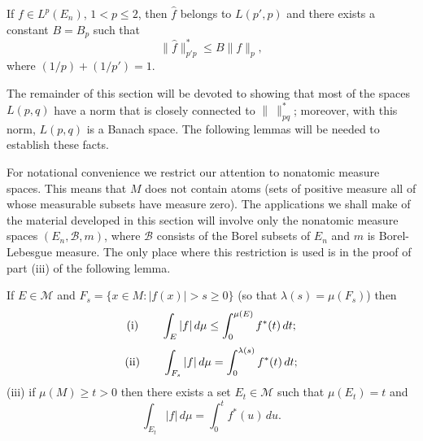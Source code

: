 \begin{corollary}\label{cor:c5-3-16}
If $f \in L^{p}(E_{n})$, $1 < p \leq 2$, then $\hat{f}$ belongs to
$L(p', p)$ and there exists a constant $B = B_{p}$ such that
\[
\|\hat{f}\|_{p'p}^{*}\leq B\|f\|_{p},
\]
where $(1/p) + (1/p') = 1$.
\end{corollary}

The remainder of this section will be devoted to showing that most of the
spaces $L(p, q)$ have a norm that is closely connected to $\|\ \|_{pq}^{*}$;
moreover, with this norm, $L(p, q)$ is a Banach space. The following lemmas
will be needed to establish these facts.

For notational convenience we restrict our attention to nonatomic measure
spaces. This means that $M$ does not contain atoms (sets of positive measure
all of whose measurable subsets have measure zero). The applications we shall
make of the material developed in this section will involve only the nonatomic
measure spaces $(E_{n}, \mathcal{B}, m)$, where $\mathcal{B}$ consists of the
Borel subsets of $E_{n}$ and $m$ is Borel-Lebesgue measure. The only place
where this restriction is used is in the proof of part (iii) of the following
lemma.

\begin{lemma}\label{lem:c5-3-17}
If $E \in \mathcal{M}$ and
$F_{s} = \{x \in M : |f(x)| > s \geq 0\}$ (so that $\lambda(s) = \mu(F_{s})$)
then
\[
\textup{(i)}\qquad \int_{E}|f|\,d\mu\leq\int_{0}^{\mu(E)}f^{*}(t)\,dt;
\]
\[
\textup{(ii)}\qquad \int_{F_{s}}|f|\,d\mu=\int_{0}^{\lambda(s)}f^{*}(t)\,dt;
\]
\textup{(iii)} if $\mu(M) \geq t > 0$ then there exists a set
$E_{t} \in \mathcal{M}$ such that $\mu(E_{t}) = t$ and
\[
\int_{E_{t}}|f|\,d\mu=\int_{0}^{t}f^{*}(u)\,du.
\]
\end{lemma}

